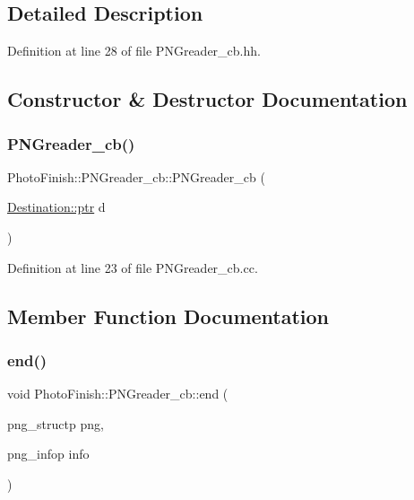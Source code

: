 \subsection{Detailed Description}


Definition at line 28 of file P\+N\+Greader\+\_\+cb.\+hh.



\subsection{Constructor \& Destructor Documentation}
\mbox{\label{struct_photo_finish_1_1_p_n_greader__cb_a61276c41ef0af568dc0969e636da2415}} 
\subsubsection{\texorpdfstring{P\+N\+Greader\+\_\+cb()}{PNGreader\_cb()}}
{\footnotesize\ttfamily Photo\+Finish\+::\+P\+N\+Greader\+\_\+cb\+::\+P\+N\+Greader\+\_\+cb (\begin{DoxyParamCaption}\item[{\hyperlink{class_photo_finish_1_1_destination_a0d282a905cd81c3f0e6d7233c9bc7774}{Destination\+::ptr}}]{d }\end{DoxyParamCaption})}



Definition at line 23 of file P\+N\+Greader\+\_\+cb.\+cc.



\subsection{Member Function Documentation}
\mbox{\label{struct_photo_finish_1_1_p_n_greader__cb_a1231dbe03cde27382402ebc7a7a5dbd1}} 
\subsubsection{\texorpdfstring{end()}{end()}}
{\footnotesize\ttfamily void Photo\+Finish\+::\+P\+N\+Greader\+\_\+cb\+::end (\begin{DoxyParamCaption}\item[{png\+\_\+structp}]{png,  }\item[{png\+\_\+infop}]{info }\end{DoxyParamCaption})}



